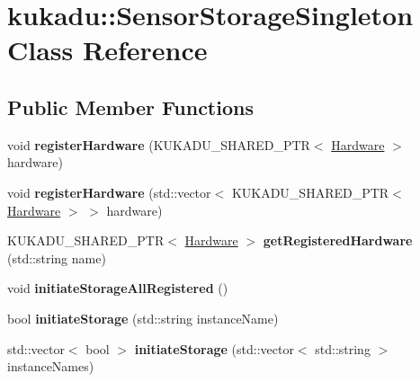 \hypertarget{classkukadu_1_1SensorStorageSingleton}{}\section{kukadu\+:\+:Sensor\+Storage\+Singleton Class Reference}
\label{classkukadu_1_1SensorStorageSingleton}
\subsection*{Public Member Functions}
\begin{DoxyCompactItemize}
\item 
void {\bfseries register\+Hardware} (K\+U\+K\+A\+D\+U\+\_\+\+S\+H\+A\+R\+E\+D\+\_\+\+P\+TR$<$ \hyperlink{classkukadu_1_1Hardware}{Hardware} $>$ hardware)\hypertarget{classkukadu_1_1SensorStorageSingleton_a76d3245bb252c67f1c28894de094b439}{}\label{classkukadu_1_1SensorStorageSingleton_a76d3245bb252c67f1c28894de094b439}

\item 
void {\bfseries register\+Hardware} (std\+::vector$<$ K\+U\+K\+A\+D\+U\+\_\+\+S\+H\+A\+R\+E\+D\+\_\+\+P\+TR$<$ \hyperlink{classkukadu_1_1Hardware}{Hardware} $>$ $>$ hardware)\hypertarget{classkukadu_1_1SensorStorageSingleton_a6e2f2f5ec7eb134b005f97f935855e98}{}\label{classkukadu_1_1SensorStorageSingleton_a6e2f2f5ec7eb134b005f97f935855e98}

\item 
K\+U\+K\+A\+D\+U\+\_\+\+S\+H\+A\+R\+E\+D\+\_\+\+P\+TR$<$ \hyperlink{classkukadu_1_1Hardware}{Hardware} $>$ {\bfseries get\+Registered\+Hardware} (std\+::string name)\hypertarget{classkukadu_1_1SensorStorageSingleton_a094a828348e3b8c44059f0213fbc5cfa}{}\label{classkukadu_1_1SensorStorageSingleton_a094a828348e3b8c44059f0213fbc5cfa}

\item 
void {\bfseries initiate\+Storage\+All\+Registered} ()\hypertarget{classkukadu_1_1SensorStorageSingleton_a5c9331e0050e7b78a768e01ab3187ffc}{}\label{classkukadu_1_1SensorStorageSingleton_a5c9331e0050e7b78a768e01ab3187ffc}

\item 
bool {\bfseries initiate\+Storage} (std\+::string instance\+Name)\hypertarget{classkukadu_1_1SensorStorageSingleton_acd5e5b5fef96cf73dd961116900d1aba}{}\label{classkukadu_1_1SensorStorageSingleton_acd5e5b5fef96cf73dd961116900d1aba}

\item 
std\+::vector$<$ bool $>$ {\bfseries initiate\+Storage} (std\+::vector$<$ std\+::string $>$ instance\+Names)\hypertarget{classkukadu_1_1SensorStorageSingleton_ac4051b3f4f3e148ba7ab58a80a0c855f}{}\label{classkukadu_1_1SensorStorageSingleton_ac4051b3f4f3e148ba7ab58a80a0c855f}


\end{DoxyCompactItemize}
